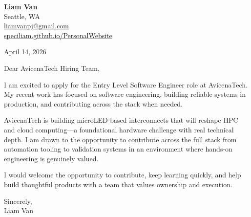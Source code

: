 \documentclass[letterpaper,11pt]{article}
\begin{document}
\begin{flushleft}
\textbf{\Large Liam Van} \\
Seattle, WA \\
\href{mailto:liamvanpj@gmail.com}{liamvanpj@gmail.com} \\
\href{https://speciliam.github.io/PersonalWebsite}{speciliam.github.io/PersonalWebsite}
\end{flushleft}

April 14, 2026

\noindent Dear AvicenaTech Hiring Team,

\noindent I am excited to apply for the Entry Level Software Engineer role at AvicenaTech. My recent work has focused on software engineering, building reliable systems in production, and contributing across the stack when needed.

\noindent AvicenaTech is building microLED-based interconnects that will reshape HPC and cloud computing---a foundational hardware challenge with real technical depth. I am drawn to the opportunity to contribute across the full stack from automation tooling to validation systems in an environment where hands-on engineering is genuinely valued.

\noindent I would welcome the opportunity to contribute, keep learning quickly, and help build thoughtful products with a team that values ownership and execution.

\noindent Sincerely, \\
Liam Van
\end{document}
